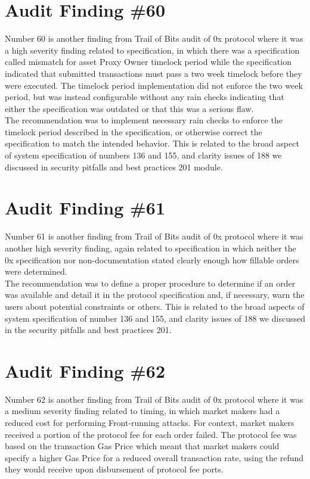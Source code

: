 \section{Audit Finding \#60}

Number 60 is another finding from Trail of Bits audit of 0x protocol where it was a high severity finding related to specification, in which there was a specification called mismatch for asset Proxy Owner timelock period while the specification indicated that submitted transactions must pass a two week timelock before they were executed. The timelock period implementation did not enforce the two week period, but was instead configurable without any rain checks indicating that either the specification was outdated or that this was a serious flaw.\\

The recommendation was to implement necessary rain checks to enforce the timelock period described in the specification, or otherwise correct the specification to match the intended behavior. This is related to the broad aspect of system specification of numbers 136 and 155, and clarity issues of 188 we discussed in security pitfalls and best practices 201 module.

\section{Audit Finding \#61}

Number 61 is another finding from Trail of Bits audit of 0x protocol where it was another high severity finding, again related to specification in which neither the 0x specification nor non-documentation stated clearly enough how fillable orders were determined.\\

The recommendation was to define a proper procedure to determine if an order was available and detail it in the protocol specification and, if necessary, warn the users about potential constraints or others. This is related to the broad aspects of system specification of number 136 and 155, and clarity issues of 188 we discussed in the security pitfalls and best practices 201.

\section{Audit Finding \#62}

Number 62 is another finding from Trail of Bits audit of 0x protocol where it was a medium severity finding related to timing, in which market makers had a reduced cost for performing Front-running attacks. For context, market makers received a portion of the protocol fee for each order failed. The protocol fee was based on the transaction Gas Price which meant that market makers could specify a higher Gas Price for a reduced overall transaction rate, using the refund they would receive upon disbursement of protocol fee ports.\\

